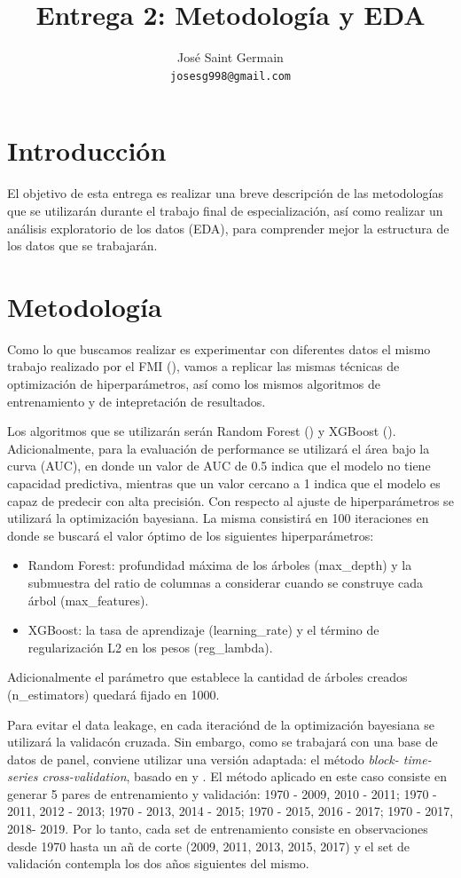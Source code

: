 \documentclass{article}
\title{Entrega 2: Metodología y EDA}
\author{%
  José Saint Germain\\
  \texttt{josesg998@gmail.com} \\
}
\begin{document}
\maketitle

\section{Introducción}
El objetivo de esta entrega es realizar una breve descripción de las metodologías 
que se utilizarán durante el trabajo final de especialización, así como realizar 
un análisis exploratorio de los datos (EDA), para comprender mejor la estructura 
de los datos que se trabajarán.

\section{Metodología}
Como lo que buscamos realizar es experimentar con diferentes datos el mismo 
trabajo realizado por el FMI (\cite{Ceb24}), vamos a replicar las mismas 
técnicas de optimización de hiperparámetros, así como los mismos algoritmos
de entrenamiento y de intepretación de resultados.
 
Los algoritmos que se utilizarán serán Random Forest (\cite{Bre01}) y XGBoost
(\cite{Che16}). Adicionalmente, para la evaluación de performance se utilizará 
el área bajo la curva (AUC), en donde un valor de AUC de 0.5 indica que el modelo 
no tiene capacidad predictiva, mientras que un valor cercano a 1 indica que el 
modelo es capaz de predecir con alta precisión. Con respecto al ajuste de 
hiperparámetros se utilizará la optimización bayesiana. La misma consistirá en 100 
iteraciones en donde se buscará el valor óptimo de los siguientes hiperparámetros:

\begin{itemize}
  \item Random Forest: profundidad máxima de los árboles (max\_depth) y la 
  submuestra del ratio de columnas a considerar cuando se construye cada árbol 
  (max\_features).
  \item XGBoost: la tasa de aprendizaje (learning\_rate) y el término de 
  regularización L2 en los pesos (reg\_lambda).
\end{itemize}

Adicionalmente el parámetro que establece la cantidad de árboles creados 
(n\_estimators) quedará fijado en 1000.

Para evitar el data leakage, en cada iteraciónd de la optimización bayesiana
se utilizará la validacón cruzada. Sin embargo, como se trabajará con una base
de datos de panel, conviene utilizar una versión adaptada: el método \textit{block-
time-series cross-validation}, basado en \cite{Bur94} y \cite{RAc00}. El método 
aplicado en este caso consiste en generar 5 pares de entrenamiento y validación: 
{1970 - 2009, 2010 - 2011}; {1970 - 2011, 2012 - 2013}; {1970 - 2013, 2014 - 2015}; 
{1970 - 2015, 2016 - 2017}; {1970 - 2017, 2018- 2019}. Por lo tanto, cada set de 
entrenamiento consiste en observaciones desde 1970 hasta un añ de corte (2009, 
2011, 2013, 2015, 2017) y el set de validación contempla los dos años siguientes 
del mismo.
\end{document}
